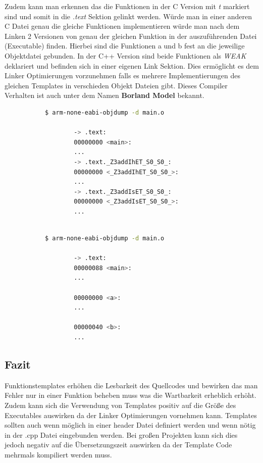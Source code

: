 \documentclass[MES,Master,ngerman]{twbook}%
\begin{document}
Zudem kann man erkennen das die Funktionen in der C Version mit \textit{t} markiert sind und somit in die \textit{.text} Sektion gelinkt werden. Würde man in einer anderen C Datei genau die gleiche Funktionen implementieren würde man nach dem Linken 2 Versionen von genau der gleichen Funktion in der auszuführenden Datei (Executable) finden. Hierbei sind die Funktionen a und b fest an die jeweilige Objektdatei gebunden. In der C++ Version sind beide Funktionen als \textit{WEAK} deklariert und befinden sich in einer eigenen Link Sektion. Dies ermöglicht es dem Linker Optimierungen vorzunehmen falls es mehrere Implementierungen des gleichen Templates in verschieden Objekt Dateien gibt. Dieses Compiler Verhalten ist auch unter dem Namen \textbf{Borland Model} bekannt.

\begin{figure}[!htb]
	\begin{subfigure}[b]{0.5\textwidth}
		\begin{lstlisting}[gobble=6, title={Analyse C++}, language=bash, numbers=none]
		$ arm-none-eabi-objdump -d main.o

		-> .text:
		00000000 <main>:
		...
		-> .text._Z3addIhET_S0_S0_:
		00000000 <_Z3addIhET_S0_S0_>:
		...
		-> .text._Z3addIsET_S0_S0_:
		00000000 <_Z3addIsET_S0_S0_>:
		...
		
		\end{lstlisting}
	\end{subfigure}
	\begin{subfigure}[b]{0.5\textwidth}
		\begin{lstlisting}[gobble=6, title={Analyse C}, language=bash, numbers=none]
		$ arm-none-eabi-objdump -d main.o
		
		-> .text:
		00000088 <main>:
		...
		
		00000000 <a>:
		...
		
		00000040 <b>:
		...
		\end{lstlisting}
	\end{subfigure}
\end{figure}

\subsection{Fazit}
Funktionstemplates erhöhen die Lesbarkeit des Quellcodes und bewirken das man Fehler nur in einer Funktion beheben muss was die Wartbarkeit erheblich erhöht. Zudem kann sich die Verwendung von Templates positiv auf die Größe des Executables auswirken da der Linker Optimierungen vornehmen kann. Templates sollten auch wenn möglich in einer header Datei definiert werden und wenn nötig in der .cpp Datei eingebunden werden. Bei großen Projekten kann sich dies jedoch negativ auf die Übersetzungszeit auswirken da der Template Code mehrmals kompiliert werden muss.
\newpage
\end{document}
